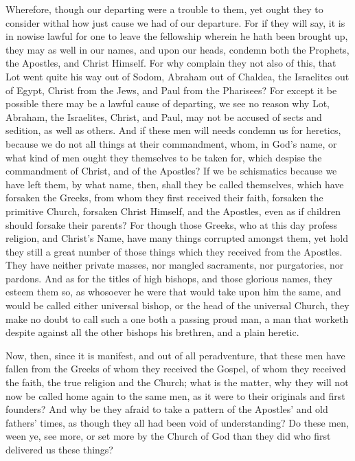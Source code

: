 Wherefore, though our departing were a trouble to them, yet ought
they to consider withal how just cause we had of our departure.
For if they will say, it is in nowise lawful for one to leave the fellowship
wherein he hath been brought up, they may as well in our names, and
upon our heads, condemn both the Prophets, the Apostles, and Christ
Himself. For why complain they not also
of this, that Lot went quite his way out of Sodom, Abraham out of Chaldea,
the Israelites out of Egypt, Christ from the Jews, and Paul from the
Pharisees? For except it be possible there may be a lawful cause
of departing, we see no reason why Lot, Abraham, the Israelites, Christ,
and Paul, may not be accused of sects and sedition, as well as others.
And if these men will needs condemn us for heretics, because we do not
all things at their commandment, whom, in God’s name, or what
kind of men ought they themselves to be taken for, which despise the
commandment of Christ, and of the Apostles? If we be schismatics
because we have left them, by what name, then, shall they be called
themselves, which have forsaken the Greeks, from whom they first received
their faith, forsaken the primitive Church, forsaken Christ Himself,
and the Apostles, even as if children should forsake their parents?
For though those Greeks, who at this day profess religion, and Christ’s
Name, have many things corrupted amongst them, yet hold they still a
great number of those things which they received from the Apostles.
They have neither private masses, nor mangled sacraments, nor purgatories,
nor pardons. And as for the titles of high bishops, and those
glorious names,
they esteem them so, as whosoever he were that would take upon him the
same, and would be called either universal bishop, or the head of the
universal Church, they make no doubt to call such a one both a passing
proud man, a man that worketh despite against all the other bishops
his brethren, and a plain heretic.

Now, then, since it is manifest, and out of all peradventure, that
these men have fallen from the Greeks of whom they received the Gospel,
of whom they received the faith, the true religion and the Church; what
is the matter, why they will not now be called home again to the same
men, as it were to their originals and first founders? And why
be they afraid to take a pattern of the Apostles’ and old fathers’
times, as though they all had been void of understanding? Do these
men, ween ye, see more, or set more by the Church of God than they did
who first delivered us these things?

